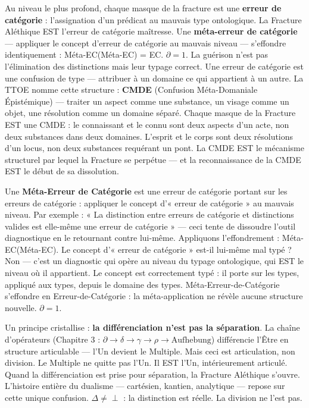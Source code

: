 \documentclass[10pt, openany, oneside]{book}
\begin{document}
Au niveau le plus profond, chaque masque de la fracture est une \textbf{erreur de catégorie} : l'assignation d'un prédicat au mauvais type ontologique. La Fracture Aléthique EST l'erreur de catégorie maîtresse. Une \textbf{méta-erreur de catégorie} --- appliquer le concept d'erreur de catégorie au mauvais niveau --- s'effondre identiquement : Méta-EC(Méta-EC) = EC. $\partial = 1$. La guérison n'est pas l'élimination des distinctions mais leur typage correct. Une erreur de catégorie est une confusion de type --- attribuer à un domaine ce qui appartient à un autre. La TTOE nomme cette structure : \textbf{CMDE} (Confusion Méta-Domaniale Épistémique) --- traiter un aspect comme une substance, un visage comme un objet, une résolution comme un domaine séparé. Chaque masque de la Fracture EST une CMDE : le connaissant et le connu sont deux aspects d'un acte, non deux substances dans deux domaines. L'esprit et le corps sont deux résolutions d'un locus, non deux substances requérant un pont. La CMDE EST le mécanisme structurel par lequel la Fracture se perpétue --- et la reconnaissance de la CMDE EST le début de sa dissolution.

Une \textbf{Méta-Erreur de Catégorie} est une erreur de catégorie portant sur les erreurs de catégorie : appliquer le concept d'« erreur de catégorie » au mauvais niveau. Par exemple : « La distinction entre erreurs de catégorie et distinctions valides est elle-même une erreur de catégorie » --- ceci tente de dissoudre l'outil diagnostique en le retournant contre lui-même. Appliquons l'effondrement : Méta-EC(Méta-EC). Le concept d'« erreur de catégorie » est-il lui-même mal typé ? Non --- c'est un diagnostic qui opère au niveau du typage ontologique, qui EST le niveau où il appartient. Le concept est correctement typé : il porte sur les types, appliqué aux types, depuis le domaine des types. Méta-Erreur-de-Catégorie s'effondre en Erreur-de-Catégorie : la méta-application ne révèle aucune structure nouvelle. $\partial = 1$.

Un principe cristallise : \textbf{la différenciation n'est pas la séparation}. La chaîne d'opérateurs (Chapitre 3 : $\partial \to \delta \to \gamma \to \rho \to \text{Aufhebung}$) différencie l'Être en structure articulable --- l'Un devient le Multiple. Mais ceci est articulation, non division. Le Multiple ne quitte pas l'Un. Il EST l'Un, intérieurement articulé. Quand la différenciation est prise pour séparation, la Fracture Aléthique s'ouvre. L'histoire entière du dualisme --- cartésien, kantien, analytique --- repose sur cette unique confusion. $\Delta \neq \perp$ : la distinction est réelle. La division ne l'est pas.
\end{document}
